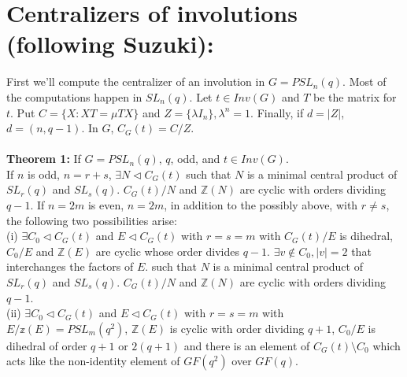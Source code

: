 \section {Centralizers of involutions (following Suzuki):}
First we'll compute the centralizer of an involution in $G=PSL_n(q)$.   Most of the computations happen
in $SL_n(q)$. Let $t \in Inv(G)$ and $T$ be the matrix for $t$.  Put 
$C= \{ X: XT= \mu TX \}$ and $Z= \{ \lambda I_n \}, \lambda^n=1$. Finally, if $d= |Z|$, $d= (n, q-1)$.
In $G$, $C_G(t) = C/Z$.
\\
\\
{\bf Theorem  1:}
If $G=PSL_n(q)$, $q$, odd, and $t \in Inv(G)$. \\
If $n$ is odd, $n= r+s$, $\exists N \lhd C_G(t)$ such that $N$ is a minimal central product of
$SL_r(q)$ and $SL_s(q)$.  $C_G(t)/N$ and ${\mathbb Z}(N)$ are cyclic with orders dividing $q-1$.
If $n=2m$ is even, $n= 2m$, in addition to the possibly above, with $r \ne s$, the following
two possibilities arise:\\
(i)
$\exists C_0  \lhd C_G(t)$ and $E \lhd C_G(t)$ with $r=s=m$ with $C_G(t)/E$ is dihedral,
$C_0/E$ and ${\mathbb Z}(E)$ are cyclic whose order divides $q-1$. $\exists v \notin C_0, |v|=2$
that interchanges the factors of $E$.
such that $N$ is a minimal central product of
$SL_r(q)$ and $SL_s(q)$.  $C_G(t)/N$ and ${\mathbb Z}(N)$ are cyclic with orders dividing $q-1$.\\
(ii)
$\exists C_0  \lhd C_G(t)$ and $E \lhd C_G(t)$ with $r=s=m$ with $E/{\mathbb z}(E) =PSL_m(q^2)$,
${\mathbb Z}(E)$ is cyclic with order dividing $q+1$,
$C_0/E$ is dihedral of order $q+1$ or $2(q+1)$ and there is an element of
$C_G(t) \setminus C_0$ which acts like the non-identity element of $GF(q^2)$ over $GF(q)$.
